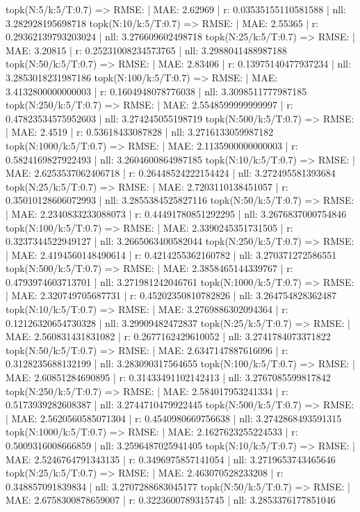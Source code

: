 topk(N:5/k:5/T:0.7) => RMSE: | MAE: 2.62969 | r: 0.03535155110581588 | nll: 3.282928195698718
topk(N:10/k:5/T:0.7) => RMSE: | MAE: 2.55365 | r: 0.29362139793203024 | nll: 3.276609602498718
topk(N:25/k:5/T:0.7) => RMSE: | MAE: 3.20815 | r: 0.25231008234573765 | nll: 3.2988041488987188
topk(N:50/k:5/T:0.7) => RMSE: | MAE: 2.83406 | r: 0.13975140477937234 | nll: 3.2853018231987186
topk(N:100/k:5/T:0.7) => RMSE: | MAE: 3.4132800000000003 | r: 0.1604948078776038 | nll: 3.3098511777987185
topk(N:250/k:5/T:0.7) => RMSE: | MAE: 2.5548599999999997 | r: 0.47823534575952603 | nll: 3.274245055198719
topk(N:500/k:5/T:0.7) => RMSE: | MAE: 2.4519 | r: 0.53618433087828 | nll: 3.2716133059987182
topk(N:1000/k:5/T:0.7) => RMSE: | MAE: 2.1135900000000003 | r: 0.5824169827922493 | nll: 3.2604600864987185
topk(N:10/k:5/T:0.7) => RMSE: | MAE: 2.6253537062406718 | r: 0.26448524222154424 | nll: 3.272495581393684
topk(N:25/k:5/T:0.7) => RMSE: | MAE: 2.7203110138451057 | r: 0.35010128606072993 | nll: 3.2855384525827116
topk(N:50/k:5/T:0.7) => RMSE: | MAE: 2.2340833233088073 | r: 0.44491780851292295 | nll: 3.2676837000754846
topk(N:100/k:5/T:0.7) => RMSE: | MAE: 2.3390245351731505 | r: 0.3237344522949127 | nll: 3.2665063400582044
topk(N:250/k:5/T:0.7) => RMSE: | MAE: 2.4194560148490614 | r: 0.4214255362160782 | nll: 3.270371272586551
topk(N:500/k:5/T:0.7) => RMSE: | MAE: 2.3858465144339767 | r: 0.4793974603713701 | nll: 3.271981242046761
topk(N:1000/k:5/T:0.7) => RMSE: | MAE: 2.320749705687731 | r: 0.45202350810782826 | nll: 3.264754828362487
topk(N:10/k:5/T:0.7) => RMSE: | MAE: 3.2769886302094364 | r: 0.12126320654730328 | nll: 3.29909482472837
topk(N:25/k:5/T:0.7) => RMSE: | MAE: 2.560831431831082 | r: 0.2677162429610052 | nll: 3.2741784073371822
topk(N:50/k:5/T:0.7) => RMSE: | MAE: 2.6347147887616096 | r: 0.3128235688132199 | nll: 3.283090317564655
topk(N:100/k:5/T:0.7) => RMSE: | MAE: 2.60851284690895 | r: 0.31433491102142413 | nll: 3.2767085599817842
topk(N:250/k:5/T:0.7) => RMSE: | MAE: 2.584017953241334 | r: 0.5173939282608387 | nll: 3.2744710479922445
topk(N:500/k:5/T:0.7) => RMSE: | MAE: 2.5620560585071304 | r: 0.4540980669756638 | nll: 3.2742868493591315
topk(N:1000/k:5/T:0.7) => RMSE: | MAE: 2.1627623255224533 | r: 0.5009316008666859 | nll: 3.2596487025941405
topk(N:10/k:5/T:0.7) => RMSE: | MAE: 2.5246764791343135 | r: 0.3496975857141054 | nll: 3.2719653743465646
topk(N:25/k:5/T:0.7) => RMSE: | MAE: 2.463070528233208 | r: 0.348857091839834 | nll: 3.2707288683045177
topk(N:50/k:5/T:0.7) => RMSE: | MAE: 2.6758300878659007 | r: 0.3223600789315745 | nll: 3.2853376177851046
